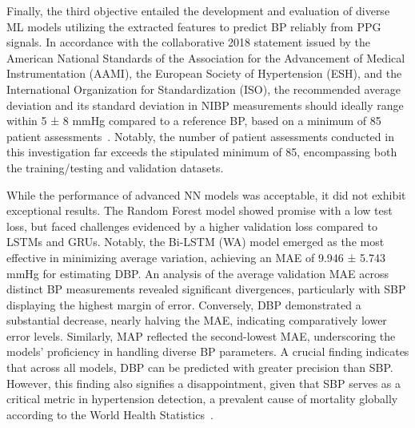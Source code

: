 Finally, the third objective entailed the development and evaluation of diverse ML models utilizing the extracted features to predict BP reliably from PPG signals.
In accordance with the collaborative 2018 statement issued by the American National Standards of the Association for the Advancement of Medical Instrumentation (AAMI), the European Society of Hypertension (ESH), and the International Organization for Standardization (ISO),
the recommended average deviation and its standard deviation in NIBP measurements should ideally range within 5 ± 8 mmHg compared to a reference BP, based on a minimum of 85 patient assessments~\cite{stergiouUniversalStandardValidation2018}.
Notably, the number of patient assessments conducted in this investigation far exceeds the stipulated minimum of 85, encompassing both the training/testing and validation datasets.

While the performance of advanced NN models was acceptable, it did not exhibit exceptional results.
The Random Forest model showed promise with a low test loss, but faced challenges evidenced by a higher validation loss compared to LSTMs and GRUs.
Notably, the Bi-LSTM (WA) model emerged as the most effective in minimizing average variation, achieving an MAE of 9.946 ± 5.743 mmHg for estimating DBP\@.
An analysis of the average validation MAE across distinct BP measurements revealed significant divergences, particularly with SBP displaying the highest margin of error.
Conversely, DBP demonstrated a substantial decrease, nearly halving the MAE, indicating comparatively lower error levels.
Similarly, MAP reflected the second-lowest MAE, underscoring the models' proficiency in handling diverse BP parameters.
A crucial finding indicates that across all models, DBP can be predicted with greater precision than SBP\@.
However, this finding also signifies a disappointment, given that SBP serves as a critical metric in hypertension detection,
a prevalent cause of mortality globally according to the World Health Statistics~\cite{WorldHealthStatistics2023}.

